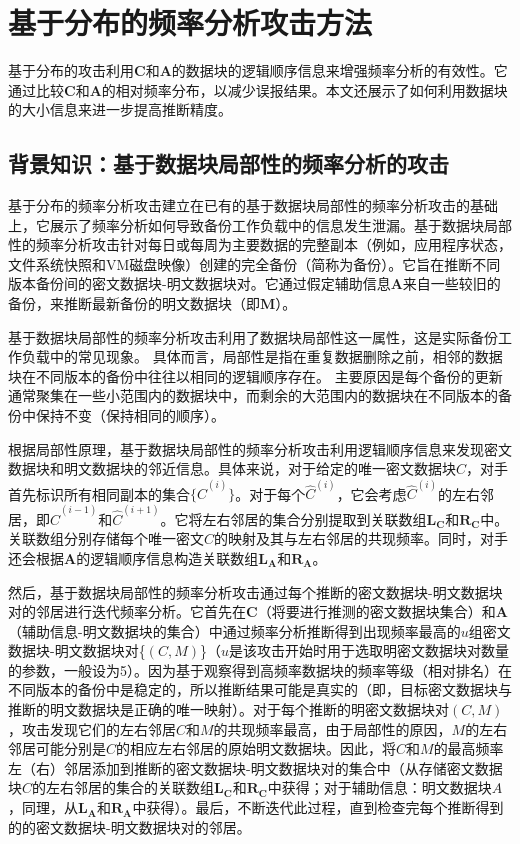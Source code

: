 \chapter{基于分布的频率分析攻击方法}
\label{sec:DistributionAttack}

基于分布的攻击利用$\mathbf{C}$和$\mathbf{A}$的数据块的逻辑顺序信息来增强频率分析的有效性。它通过比较$\mathbf{C}$和$\mathbf{A}$的相对频率分布，以减少误报结果。本文还展示了如何利用数据块的大小信息来进一步提高推断精度。

\section{背景知识：基于数据块局部性的频率分析的攻击}

\label{sec:DistributionAttack-prior-attack}

基于分布的频率分析攻击建立在已有的基于数据块局部性的频率分析攻击的基础上，它展示了频率分析如何导致备份工作负载中的信息发生泄漏。基于数据块局部性的频率分析攻击针对每日或每周为主要数据的完整副本（例如，应用程序状态，文件系统快照和VM磁盘映像）创建的完全备份（简称为备份）。它旨在推断不同版本备份间的密文数据块-明文数据块对。它通过假定辅助信息$\mathbf{A}$来自一些较旧的备份，来推断最新备份的明文数据块（即$\mathbf{M}$）。

基于数据块局部性的频率分析攻击利用了数据块局部性这一属性，这是实际备份工作负载中的常见现象。 具体而言，局部性是指在重复数据删除之前，相邻的数据块在不同版本的备份中往往以相同的逻辑顺序存在。 主要原因是每个备份的更新通常聚集在一些小范围内的数据块中，而剩余的大范围内的数据块在不同版本的备份中保持不变（保持相同的顺序）。

根据局部性原理，基于数据块局部性的频率分析攻击利用逻辑顺序信息来发现密文数据块和明文数据块的邻近信息。具体来说，对于给定的唯一密文数据块$C$，对手首先标识所有相同副本的集合$\{\hat{C}^{(i)}\}$。对于每个$\hat{C}^{(i)}$，它会考虑$\hat{C}^{(i)}$的左右邻居，即$\hat{C}^{(i-1)}$和$\hat{C}^{(i+1)}$。它将左右邻居的集合分别提取到关联数组$\mathbf{L_C}$和$\mathbf{R_C}$中。关联数组分别存储每个唯一密文$C$的映射及其与左右邻居的共现频率。同时，对手还会根据$\mathbf{A}$的逻辑顺序信息构造关联数组$\mathbf{L_A}$和$\mathbf{R_A}$。

然后，基于数据块局部性的频率分析攻击通过每个推断的密文数据块-明文数据块对的邻居进行迭代频率分析。它首先在$\mathbf{C}$（将要进行推测的密文数据块集合）和$\mathbf{A}$（辅助信息-明文数据块的集合）中通过频率分析推断得到出现频率最高的$u$组密文数据块-明文数据块对\{$(C,M)$\}（$u$是该攻击开始时用于选取明密文数据块对数量的参数，一般设为5）。因为基于观察得到高频率数据块的频率等级（相对排名）在不同版本的备份中是稳定的，所以推断结果可能是真实的（即，目标密文数据块与推断的明文数据块是正确的唯一映射）。对于每个推断的明密文数据块对$(C,M)$，攻击发现它们的左右邻居$C$和$M$的共现频率最高，由于局部性的原因，$M$的左右邻居可能分别是$C$的相应左右邻居的原始明文数据块。因此，将$C$和$M$的最高频率左（右）邻居添加到推断的密文数据块-明文数据块对的集合中（从存储密文数据块$C$的左右邻居的集合的关联数组$\mathbf{L_C}$和$\mathbf{R_C}$中获得；对于辅助信息：明文数据块$A$，同理，从$\mathbf{L_A}$和$\mathbf{R_A}$中获得）。最后，不断迭代此过程，直到检查完每个推断得到的的密文数据块-明文数据块对的邻居。

